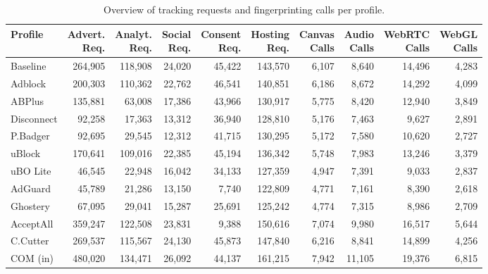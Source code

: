 \begin{table}[t]
\caption{Overview of tracking requests and fingerprinting calls per profile.}
\label{tab:tracking-summary}
\footnotesize
\begin{tabular}{lrrrrrrrrr}
\toprule
\textbf{Profile} & \shortstack{\textbf{Advert.}\\\textbf{Req.}} & \shortstack{\textbf{Analyt.}\\\textbf{Req.}} & \shortstack{\textbf{Social}\\\textbf{Req.}} & \shortstack{\textbf{Consent}\\\textbf{Req.}} & \shortstack{\textbf{Hosting}\\\textbf{Req.}} & \shortstack{\textbf{Canvas}\\\textbf{Calls}} & \shortstack{\textbf{Audio}\\\textbf{Calls}} & \shortstack{\textbf{WebRTC}\\\textbf{Calls}} & \shortstack{\textbf{WebGL}\\\textbf{Calls}} \\
\midrule
Baseline & 264,905 & 118,908 & 24,020 & 45,422 & 143,570 & 6,107 & 8,640 & 14,496 & 4,283 \\
Adblock & 200,303 & 110,362 & 22,762 & 46,541 & 140,851 & 6,186 & 8,672 & 14,292 & 4,099 \\
ABPlus & 135,881 & 63,008 & 17,386 & 43,966 & 130,917 & 5,775 & 8,420 & 12,940 & 3,849 \\
Disconnect & 92,258 & 17,363 & 13,312 & 36,940 & 128,810 & 5,176 & 7,463 & 9,627 & 2,891 \\
P.Badger & 92,695 & 29,545 & 12,312 & 41,715 & 130,295 & 5,172 & 7,580 & 10,620 & 2,727 \\
uBlock & 170,641 & 109,016 & 22,385 & 45,194 & 136,342 & 5,748 & 7,983 & 13,246 & 3,379 \\
uBO Lite & 46,545 & 22,948 & 16,042 & 34,133 & 127,359 & 4,947 & 7,391 & 9,033 & 2,837 \\
AdGuard & 45,789 & 21,286 & 13,150 & 7,740 & 122,809 & 4,771 & 7,161 & 8,390 & 2,618 \\
Ghostery & 67,095 & 29,041 & 15,287 & 25,691 & 125,242 & 4,774 & 7,315 & 8,986 & 2,709 \\
AcceptAll & 359,247 & 122,508 & 23,831 & 9,388 & 150,616 & 7,074 & 9,980 & 16,517 & 5,644 \\
C.Cutter & 269,537 & 115,567 & 24,130 & 45,873 & 147,840 & 6,216 & 8,841 & 14,899 & 4,256 \\
COM (in) & 480,020 & 134,471 & 26,092 & 44,137 & 161,215 & 7,942 & 11,105 & 19,376 & 6,815 \\

\end{tabular}
\end{table}
